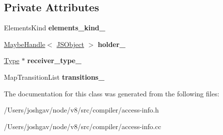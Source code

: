 \subsection*{Private Attributes}
\begin{DoxyCompactItemize}
\item 
Elements\+Kind {\bfseries elements\+\_\+kind\+\_\+}\hypertarget{classv8_1_1internal_1_1compiler_1_1_element_access_info_a730b516f6f7fedabb64a8946e20340a7}{}\label{classv8_1_1internal_1_1compiler_1_1_element_access_info_a730b516f6f7fedabb64a8946e20340a7}

\item 
\hyperlink{classv8_1_1internal_1_1_maybe_handle}{Maybe\+Handle}$<$ \hyperlink{classv8_1_1internal_1_1_j_s_object}{J\+S\+Object} $>$ {\bfseries holder\+\_\+}\hypertarget{classv8_1_1internal_1_1compiler_1_1_element_access_info_adf074a3d79a53653d252f3302891e5aa}{}\label{classv8_1_1internal_1_1compiler_1_1_element_access_info_adf074a3d79a53653d252f3302891e5aa}

\item 
\hyperlink{classv8_1_1internal_1_1_type}{Type} $\ast$ {\bfseries receiver\+\_\+type\+\_\+}\hypertarget{classv8_1_1internal_1_1compiler_1_1_element_access_info_a50181c2543b88c9685ddba8d512aee3e}{}\label{classv8_1_1internal_1_1compiler_1_1_element_access_info_a50181c2543b88c9685ddba8d512aee3e}

\item 
Map\+Transition\+List {\bfseries transitions\+\_\+}\hypertarget{classv8_1_1internal_1_1compiler_1_1_element_access_info_a77376b70a3b65e4f030f9181e64544fd}{}\label{classv8_1_1internal_1_1compiler_1_1_element_access_info_a77376b70a3b65e4f030f9181e64544fd}

\end{DoxyCompactItemize}


The documentation for this class was generated from the following files\+:\begin{DoxyCompactItemize}
\item 
/\+Users/joshgav/node/v8/src/compiler/access-\/info.\+h\item 
/\+Users/joshgav/node/v8/src/compiler/access-\/info.\+cc\end{DoxyCompactItemize}
